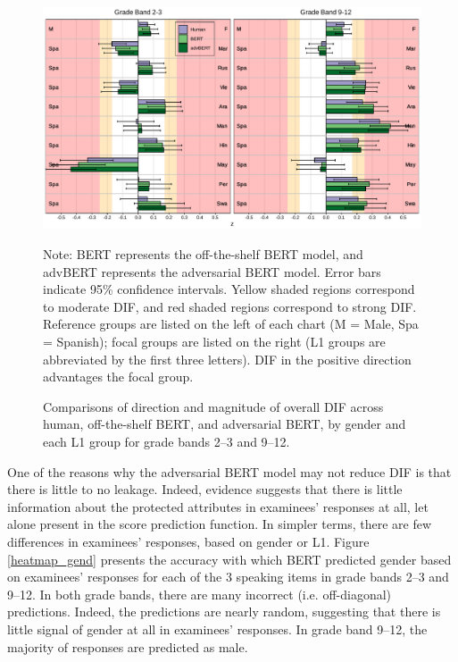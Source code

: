 \documentclass [PhD] {uclathes}
\begin{document}
\begin{figure}[h]
    \centering
    \caption{Comparisons of direction and magnitude of overall DIF across human, off-the-shelf BERT, and adversarial BERT, by gender and each L1 group for grade bands 2–3 and 9–12.}    
    \includegraphics[width=6.5in]{figures/20230517_ETS-DIF_advBERT_z_ovr_edit.pdf}
    \label{advBERT_z_ovr}
	{\newline Note: BERT represents the off-the-shelf BERT model, and advBERT represents the adversarial BERT model. Error bars indicate 95\% confidence intervals. Yellow shaded regions correspond to moderate DIF, and red shaded regions correspond to strong DIF. Reference groups are listed on the left of each chart (M = Male, Spa = Spanish); focal groups are listed on the right (L1 groups are abbreviated by the first three letters). DIF in the positive direction advantages the focal group. \par}
\end{figure}

One of the reasons why the adversarial BERT model may not reduce DIF is that there is little to no leakage. Indeed, evidence suggests that there is little information about the protected attributes in examinees’ responses at all, let alone present in the score prediction function. In simpler terms, there are few differences in examinees’ responses, based on gender or L1. Figure \ref{heatmap_gend} presents the accuracy with which BERT predicted gender based on examinees’ responses for each of the 3 speaking items in grade bands 2–3 and 9–12. In both grade bands, there are many incorrect (i.e. off-diagonal) predictions. Indeed, the predictions are nearly random, suggesting that there is little signal of gender at all in examinees’ responses. In grade band 9–12, the majority of responses are predicted as male. 
\end{document}
